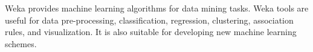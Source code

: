 Weka provides machine learning algorithms for data mining tasks. Weka tools are useful for data pre-processing, classification, regression, clustering, association rules, and visualization. It is also suitable for developing new machine learning schemes.
